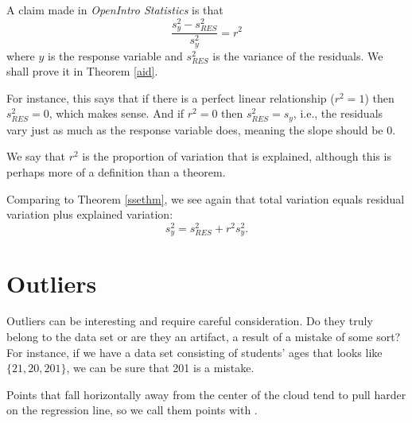 
A claim made in \emph{OpenIntro Statistics} is that
\[
	\frac{s_{y}^2 - s_{RES}^2}{s_y^2} = r^2
\]
where $y$ is the response variable and $s_{RES}^2$ is the variance of the residuals. We shall prove it in Theorem \ref{aid}.

For instance, this says that if there is a perfect linear relationship ($r^2=1$) then $s_{RES}^2=0$, which makes sense. And if $r^2=0$ then $s_{RES}^2=s_y$, i.e., the residuals vary just as much as the response variable does, meaning the slope should be 0.

We say that $r^2$ is the proportion of variation that is explained, although this is perhaps more of a definition than a theorem.


Comparing to Theorem \ref{ssethm}, we see again that total variation equals residual variation plus explained variation:
\[
	s_{y}^2 = s_{RES}^2 + r^2s_y^2.
\]



\section{Outliers}
\label{typesOfOutliersInLinearRegression}
 
 Outliers can be interesting and require careful consideration. Do they truly belong to the data set or are they an artifact, a result of a mistake of some sort? For instance, if we have a data set consisting of students' ages that looks like $\{21,20,201\}$, we can be sure that 201 is a mistake.
 
 \begin{termBox}{
Points that fall horizontally away from the center of the cloud tend to pull harder on the regression line, so we call them points with .}
\end{termBox}

